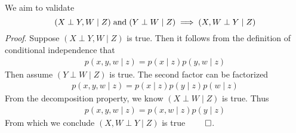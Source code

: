 \documentclass{article}
\newcommand{\s}{\hspace{0.1cm}}
\numberwithin{equation}{section}
\begin{document}
\subsection{}
We aim to validate
\begin{equation}
        (X \perp Y,W \mid Z) \s \text{and} \s (Y \perp W \mid Z) \implies  (X,W \perp Y \mid Z)
\end{equation}
\textit{Proof}. Suppose $(X \perp Y,W \mid Z)$ is true. 
Then it follows from the definition of conditional independence that
\begin{align*}
        p(x,y,w \mid z) = p(x \mid z) p(y,w \mid z) 
\end{align*}
Then assume $(Y \perp W \mid Z)$ is true. The second factor can be factorized
\begin{align*}
        p(x,y,w \mid z) = p(x \mid z) p(y \mid z) p(w \mid z)
\end{align*}
From the decomposition property, we know $(X \perp W \mid Z)$ is true. Thus
\begin{align*}
        p(x,y,w \mid z)  = p(x,w \mid z) p(y \mid z)
\end{align*}
From which we conclude $(X,W \perp Y \mid Z)$ is true $\qed$.
\end{document}
